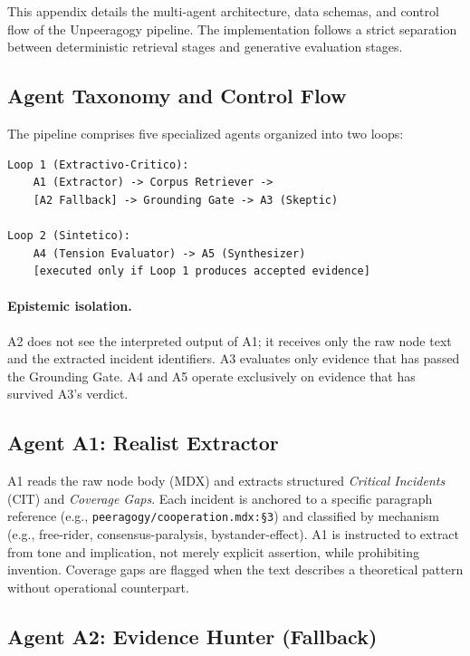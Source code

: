 \documentclass[10pt,twocolumn]{article}
\begin{document}
This appendix details the multi-agent architecture, data schemas, and control flow of the Unpeeragogy pipeline. The implementation follows a strict separation between deterministic retrieval stages and generative evaluation stages.

\subsection{Agent Taxonomy and Control Flow}

The pipeline comprises five specialized agents organized into two loops:

\begin{verbatim}
Loop 1 (Extractivo-Critico):
    A1 (Extractor) -> Corpus Retriever -> 
    [A2 Fallback] -> Grounding Gate -> A3 (Skeptic)

Loop 2 (Sintetico):
    A4 (Tension Evaluator) -> A5 (Synthesizer)
    [executed only if Loop 1 produces accepted evidence]
\end{verbatim}

\paragraph{Epistemic isolation.} A2 does not see the interpreted output of A1; it receives only the raw node text and the extracted incident identifiers. A3 evaluates only evidence that has passed the Grounding Gate. A4 and A5 operate exclusively on evidence that has survived A3's verdict.

\subsection{Agent A1: Realist Extractor}

A1 reads the raw node body (MDX) and extracts structured \emph{Critical Incidents} (CIT) and \emph{Coverage Gaps}. Each incident is anchored to a specific paragraph reference (e.g., \texttt{peeragogy/cooperation.mdx:§3}) and classified by mechanism (e.g., free-rider, consensus-paralysis, bystander-effect). A1 is instructed to extract from tone and implication, not merely explicit assertion, while prohibiting invention. Coverage gaps are flagged when the text describes a theoretical pattern without operational counterpart.

\subsection{Agent A2: Evidence Hunter (Fallback)}
\end{document}
